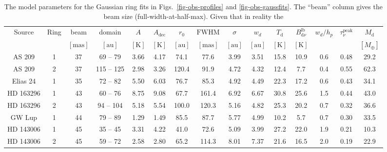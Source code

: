 \documentclass{aa}
\begin{document}
\begin{table*}
\begin{center}
\begin{tabular}{|cc|cc|cccccc|ccccc|}
Source & Ring & beam & domain & $A$ & $A_{\mathrm{dec}}$ & $r_0$ & $\mathrm{FWHM}$ & $\sigma$ & $w_d$ & $T_{\mathrm{d}}$ & $B_{\mathrm{d}\nu}^{\mathrm{lb}}$ & $w_d/h_p$ & $\tau_\nu^{\mathrm{peak}}$ & $M_{\mathrm{d}}$\\
            & & $[\mathrm{mas}]$ & $[\mathrm{au}]$ & $[\mathrm{K}]$ & $[\mathrm{K}]$ & $[\mathrm{au}]$ & $[\mathrm{mas}]$ & $[\mathrm{au}]$ & $[\mathrm{au}]$ & $\mathrm{[K]}$ & $\mathrm{[K]}$ &  &  & $[M_{\oplus}]$\\
\hline
AS 209     & 1 & 37 &  69 --  79 &   3.66 &   4.17 &  74.1 &  77.6 &   3.99 &   3.51 &  15.8 &  10.9 &   0.6 &   0.48 &  29.2\\
AS 209     & 2 & 37 & 115 -- 125 &   2.98 &   3.26 & 120.4 &  91.9 &   4.72 &   4.32 &  12.4 &   7.7 &   0.4 &   0.55 &  62.3\\
Elias 24   & 1 & 35 &  72 --  82 &   5.50 &   6.03 &  76.7 &  85.3 &   4.92 &   4.49 &  22.3 &  17.2 &   0.6 &   0.43 &  34.1\\
HD 163296  & 1 & 43 &  60 --  76 &   8.75 &   9.08 &  67.7 & 161.4 &   6.92 &   6.67 &  30.8 &  25.6 &   1.5 &   0.44 &  43.0\\
HD 163296  & 2 & 43 &  94 -- 104 &   5.18 &   5.54 & 100.0 & 120.3 &   5.16 &   4.82 &  25.3 &  20.2 &   0.7 &   0.32 &  36.6\\
GW Lup     & 1 & 44 &  79 --  89 &   1.29 &   1.49 &  85.5 &  87.7 &   5.77 &   4.99 &  10.2 &   5.7 &   0.7 &   0.30 &  33.5\\
HD 143006  & 1 & 45 &  35 --  45 &   3.31 &   4.22 &  41.0 &  72.6 &   5.09 &   3.99 &  27.2 &  22.0 &   1.9 &   0.21 &  10.3\\
HD 143006  & 2 & 45 &  59 --  72 &   2.58 &   2.80 &  65.2 & 114.3 &   8.01 &   7.37 &  21.6 &  16.5 &   2.0 &   0.19 &  22.9\\
\hline
\hline
\end{tabular}
\end{center}
\caption{\label{tab-gauss-params}The model parameters for the Gaussian ring fits
  in Figs.~\ref{fig-obs-profiles} and \ref{fig-obs-gaussfits}. The ``beam''
  column gives the beam size (full-width-at-half-max). Given that in reality the
}
\end{table*}
\end{document}

